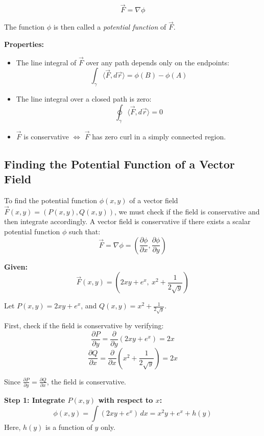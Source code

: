 \[
\vec{F} = \nabla \phi
\]

The function \( \phi \) is then called a \emph{potential function} of \( \vec{F} \).

\textbf{Properties:}
\begin{itemize}[label=\(-\)]
    \item The line integral of \( \vec{F} \) over any path depends only on the endpoints:
    \[
    \int_\gamma \langle \vec{F}, d\vec{r} \rangle = \phi(B) - \phi(A)
    \]
    \item The line integral over a closed path is zero:
    \[
    \oint_\gamma \langle \vec{F}, d\vec{r} \rangle = 0
    \]
    \item \( \vec{F} \) is conservative \( \Leftrightarrow \) \( \vec{F} \) has zero curl in a simply connected region.
\end{itemize}

\subsection{Finding the Potential Function of a Vector Field}

To find the potential function \( \phi(x, y) \) of a vector field \( \vec{F}(x, y) = (P(x, y), Q(x, y)) \), we must check if the field is conservative and then integrate accordingly. A vector field is conservative if there exists a scalar potential function \( \phi \) such that:
\[
\vec{F} = \nabla \phi = \left( \frac{\partial \phi}{\partial x}, \frac{\partial \phi}{\partial y} \right)
\]

\textbf{Given:}
\[
\vec{F}(x, y) = \left(2xy + e^x,\ x^2 + \frac{1}{2\sqrt{y}}\right)
\]

Let \( P(x, y) = 2xy + e^x \), and \( Q(x, y) = x^2 + \frac{1}{2\sqrt{y}} \).

First, check if the field is conservative by verifying:
\[
\frac{\partial P}{\partial y} = \frac{\partial}{\partial y}(2xy + e^x) = 2x
\]
\[
\frac{\partial Q}{\partial x} = \frac{\partial}{\partial x}\left(x^2 + \frac{1}{2\sqrt{y}}\right) = 2x
\]

Since \( \frac{\partial P}{\partial y} = \frac{\partial Q}{\partial x} \), the field is conservative.
\vspace{\baselineskip}

\textbf{Step 1: Integrate \( P(x, y) \) with respect to \( x \):}
\[
\phi(x, y) = \int (2xy + e^x)\,dx = x^2y + e^x + h(y)
\]
Here, \( h(y) \) is a function of \( y \) only.
\vspace{\baselineskip}

